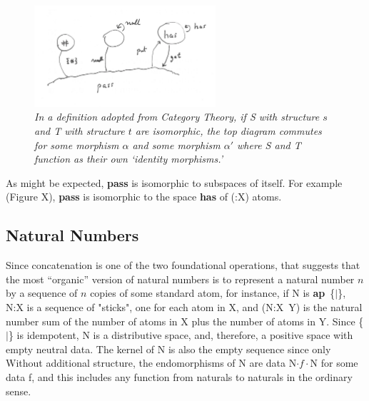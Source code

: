 \documentclass[11pt]{article}
\begin{document}
\begin{figure}[h]
\centering
\includegraphics[width=0.6\textwidth]{Pass-garden.png}
\caption{{\it In a definition adopted from Category Theory, if S with structure $s$ and T with structure $t$ are isomorphic, the top diagram commutes for some morphism $\alpha$ and some morphism $\alpha'$ where S and T function as their own `identity morphisms.' }}
\end{figure}

As might be expected, {\bf pass} is isomorphic to subspaces of itself.  For example (Figure X), {\bf pass} is isomorphic to the space {\bf has} of (:X) atoms. 

\subsection{Natural Numbers}

Since concatenation is one of the two foundational operations, that suggests that the most ``organic'' version of natural numbers is to represent a natural number $n$ by a sequence of $n$ copies of some standard atom, for instance, if N is {\bf ap}\ \{$\vert$\}, N:X is a sequence of "sticks", one for each atom in X, and (N:X\ Y) is the natural number sum of the number of atoms 
in X plus the number of atoms in Y.  Since \{$\vert$\} is idempotent, N is a distributive space, and, therefore, a positive space with empty neutral data.  The kernel of N is also the empty 
sequence since only  
Without additional structure, the endomorphisms of N are data N$\cdot f\cdot$N for some data f, and this includes any function from naturals to naturals in the ordinary sense.  
\end{document}
